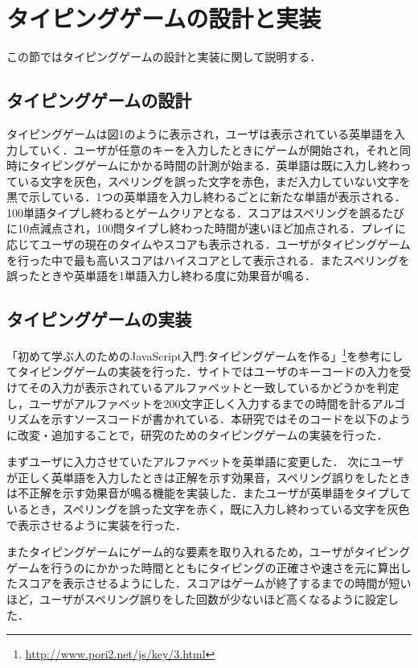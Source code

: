 \documentclass{jarticle}
\begin{document}
\section{タイピングゲームの設計と実装}

この節ではタイピングゲームの設計と実装に関して説明する．

\subsection{タイピングゲームの設計}
タイピングゲームは図1のように表示され，ユーザは表示されている英単語を入力していく．ユーザが任意のキーを入力したときにゲームが開始され，それと同時にタイピングゲームにかかる時間の計測が始まる．英単語は既に入力し終わっている文字を灰色，スペリングを誤った文字を赤色，まだ入力していない文字を黒で示している．1つの英単語を入力し終わるごとに新たな単語が表示される．100単語タイプし終わるとゲームクリアとなる．スコアはスペリングを誤るたびに10点減点され，100問タイプし終わった時間が速いほど加点される．プレイに応じてユーザの現在のタイムやスコアも表示される．ユーザがタイピングゲームを行った中で最も高いスコアはハイスコアとして表示される．またスペリングを誤ったときや英単語を1単語入力し終わる度に効果音が鳴る．

\subsection{タイピングゲームの実装}
「初めて学ぶ人のためのJavaScript入門:タイピングゲームを作る」\footnote{\url{http://www.pori2.net/js/key/3.html}}を参考にしてタイピングゲームの実装を行った．サイトではユーザのキーコードの入力を受けてその入力が表示されているアルファベットと一致しているかどうかを判定し，ユーザがアルファベットを200文字正しく入力するまでの時間を計るアルゴリズムを示すソースコードが書かれている．本研究ではそのコードを以下のように改変・追加することで，研究のためのタイピングゲームの実装を行った．

まずユーザに入力させていたアルファベットを英単語に変更した．
次にユーザが正しく英単語を入力したときは正解を示す効果音，スペリング誤りをしたときは不正解を示す効果音が鳴る機能を実装した．またユーザが英単語をタイプしているとき，スペリングを誤った文字を赤く，既に入力し終わっている文字を灰色で表示させるように実装を行った．

またタイピングゲームにゲーム的な要素を取り入れるため，ユーザがタイピングゲームを行うのにかかった時間とともにタイピングの正確さや速さを元に算出したスコアを表示させるようにした．スコアはゲームが終了するまでの時間が短いほど，ユーザがスペリング誤りをした回数が少ないほど高くなるように設定した．
\end{document}
